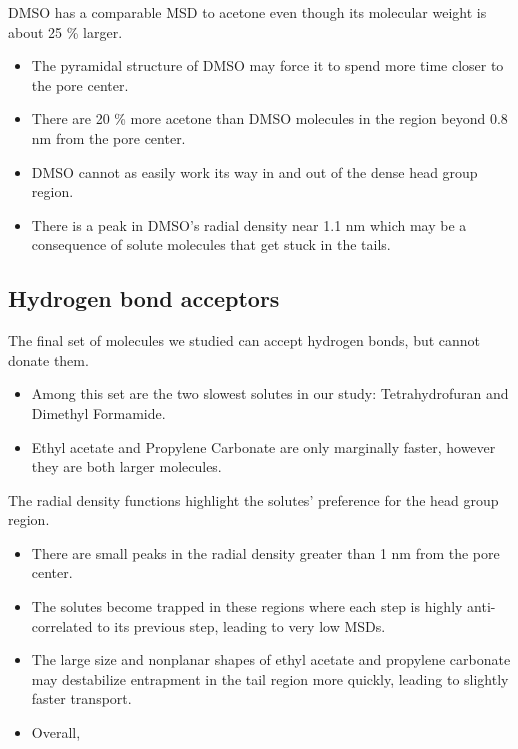 \documentclass{article}
\begin{document}
  \noindent DMSO has a comparable MSD to acetone even though its molecular weight is
  about 25 \% larger.
  \begin{itemize}
  	\item The pyramidal structure of DMSO may force it to spend more time closer to
  	the pore center.  %
  	\item There are 20 \% more acetone than DMSO molecules in the region beyond 
  	0.8 nm from the pore center.  %
  	\item DMSO cannot as easily work its way in and out of the dense head group region. %
  	\item There is a peak in DMSO's radial density near 1.1 nm which may be a consequence of 
  	solute molecules that get stuck in the tails.
  \end{itemize}  
  
  \subsection*{Hydrogen bond acceptors}  %
  
  The final set of molecules we studied can accept hydrogen bonds, but cannot donate
  them. 
  \begin{itemize}
  	\item Among this set are the two slowest solutes in our study: Tetrahydrofuran and Dimethyl Formamide.
  	\item Ethyl acetate and Propylene Carbonate are only marginally faster, however they
  	are both larger molecules. %
  \end{itemize}
  
  The radial density functions highlight the solutes' preference for the 
  head group region.
  \begin{itemize}
  	\item There are small peaks in the radial density greater than 1 nm 
  	from the pore center.
  	\item The solutes become trapped in these regions where each step is
  	highly anti-correlated to its previous step, leading to very low MSDs.
  	\item The large size and nonplanar shapes of ethyl acetate and propylene 
  	carbonate may destabilize entrapment in the tail region more quickly, leading
  	to slightly faster transport. 
  	\item Overall, 
  \end{itemize}
 
\end{document}
